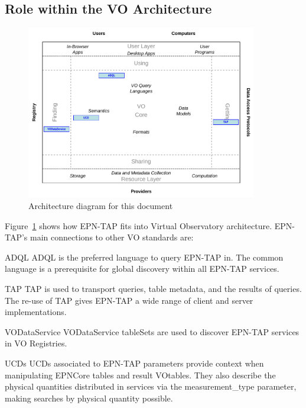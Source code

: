 \documentclass[11pt,a4paper]{ivoa}
\begin{document}
\subsection{Role within the VO Architecture}

\begin{figure}[thb]
\centering

\includegraphics[width=0.9\textwidth]{role_diagram.pdf}
\caption{Architecture diagram for this document}
\label{fig:archdiag}
\end{figure}


Figure~\ref{fig:archdiag} shows how EPN-TAP fits into Virtual
Observatory architecture.  EPN-TAP's main connections to other VO
standards are:

\begin{bigdescription}
\item[ADQL \citep{2008ivoa.spec.1030O}] ADQL is the preferred language to
query EPN-TAP in.  The common language is a prerequisite for global
discovery within all EPN-TAP services.
\item[TAP \citep{2010ivoa.spec.0327D}] TAP is used to transport queries,
table metadata, and the results of queries.  The re-use of TAP gives
EPN-TAP a wide range of client and server implementations.
\item[VODataService \citep{2010ivoa.spec.1202P}] VODataService tableSets are used to
discover EPN-TAP services in VO Registries.
\item[UCDs \citep{2018ivoa.spec.0527M}] UCDs associated to EPN-TAP parameters provide context when manipulating EPNCore tables and result VOtables. They also describe the physical quantities distributed in services via the measurement\_type parameter, making searches by physical quantity possible.
\end{bigdescription}
\end{document}
